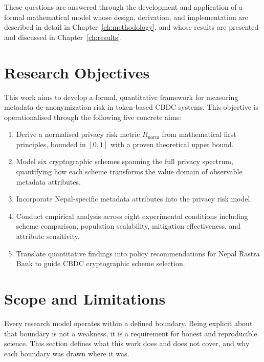 These questions are answered through the development
and application of a formal mathematical model whose
design, derivation, and implementation are described
in detail in Chapter~\ref{ch:methodology}, and whose
results are presented and discussed in
Chapter~\ref{ch:results}.

\section{Research Objectives}
\label{sec:objectives}

This work aims to develop a formal, quantitative framework
for measuring metadata de-anonymization risk in token-based
CBDC systems. This objective is operationalised through the
following five concrete aims:

\begin{enumerate}
\item Derive a normalised privacy risk metric $R_{\mathrm{norm}}$
from mathematical first principles, bounded in $[0, 1]$ with a
proven theoretical upper bound.

\item Model six cryptographic schemes spanning the full privacy
spectrum, quantifying how each scheme transforms the value
domain of observable metadata attributes.

\item Incorporate Nepal-specific metadata attributes into the
privacy risk model.

\item Conduct empirical analysis across eight experimental
conditions including scheme comparison, population scalability,
mitigation effectiveness, and attribute sensitivity.

\item Translate quantitative findings into policy recommendations
for Nepal Rastra Bank to guide CBDC cryptographic scheme
selection.
\end{enumerate}

\section{Scope and Limitations}
\label{sec:scope}

Every research model operates within a defined boundary.
Being explicit about that boundary is not a weakness, it
is a requirement for honest and reproducible science. This
section defines what this work does and does not cover,
and why each boundary was drawn where it was.

